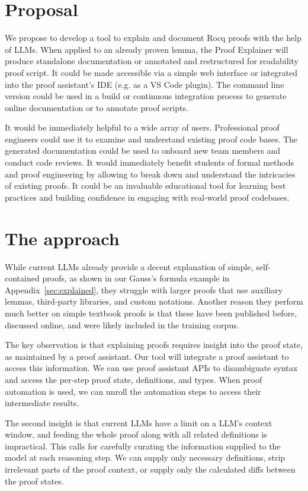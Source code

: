 \documentclass[10pt,nonacm,natbib=false]{acmart}
\begin{document}
\section*{Proposal}

We propose to develop a tool to explain and document Rocq proofs with
the help of LLMs. When applied to an already proven lemma, the Proof
Explainer will produce standalone documentation or annotated and
restructured for readability proof script. It could be made accessible
via a simple web interface or integrated into the proof assistant’s
IDE (e.g. as a VS Code plugin). The command line version could be used
in a build or continuous integration process to generate online
documentation or to annotate proof scripts.

It would be immediately helpful to a wide array of users. Professional
proof engineers could use it to examine and understand existing proof
code bases. The generated documentation could be used to onboard new
team members and conduct code reviews. It would immediately benefit
students of formal methods and proof engineering by allowing to break
down and understand the intricacies of existing proofs. It could be an
invaluable educational tool for learning best practices and building
confidence in engaging with real-world proof codebases.

\section*{The approach}

While current LLMs already provide a decent explanation of simple,
self-contained proofs, as shown in our Gauss's formula example in
Appendix~\ref{sec:explained}, they struggle with larger proofs that
use auxiliary lemmas, third-party libraries, and custom
notations. Another reason they perform much better on simple textbook
proofs is that these have been published before, discussed online, and
were likely included in the training corpus.

The key observation is that explaining proofs requires insight into
the proof state, as maintained by a proof assistant. Our tool will
integrate a proof assistant to access this information. We can use
proof assistant APIs to disambiguate syntax and access the per-step
proof state, definitions, and types. When proof automation is used, we
can unroll the automation steps to access their intermediate results.

The second insight is that current LLMs have a limit on a LLM’s
context window, and feeding the whole proof along with all related
definitions is impractical. This calls for carefully curating the
information supplied to the model at each reasoning step. We can
supply only necessary definitions, strip irrelevant parts of the proof
context, or supply only the calculated diffs between the proof states.
\end{document}
